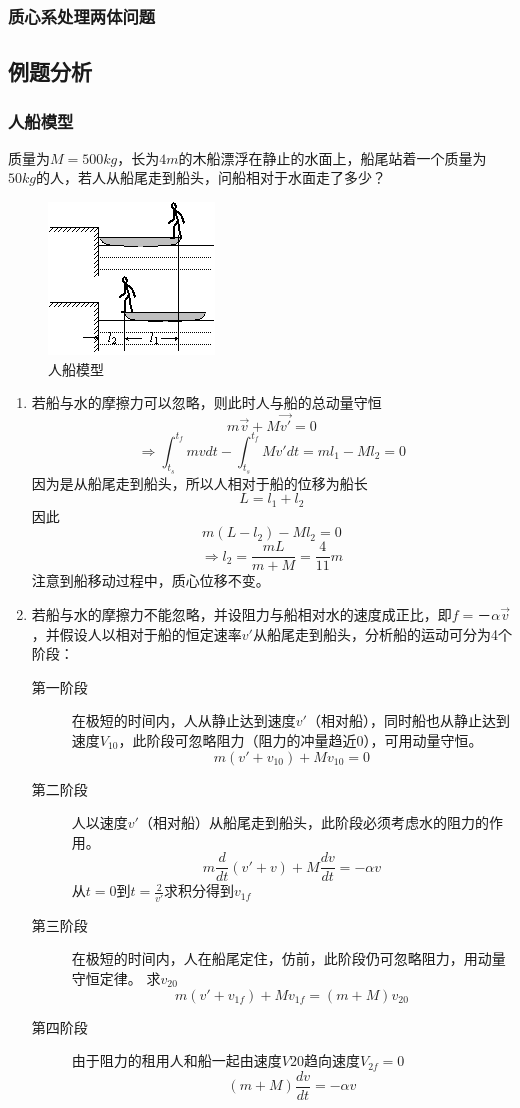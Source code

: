 \subsubsection{质心系处理两体问题}
\subsection{例题分析}
\subsubsection{人船模型}
质量为$M=500kg$，长为$4m$的木船漂浮在静止的水面上，船尾站着一个质量为$50kg$的人，若人从船尾走到船头，问船相对于水面走了多少？
\begin{figure} [ht]
\centering
\includegraphics[scale=.6]{renchuan.png}
\caption{\simsun 人船模型}
\label{renchuan}
\end{figure}

\begin{enumerate}
\item 若船与水的摩擦力可以忽略，则此时人与船的总动量守恒
\[m\vec{v}+M\vec{v'}=0\]
\[\Rightarrow\int_{t_s}^{t_f}mvdt-\int_{t_s}^{t_f}Mv'dt=ml_1-Ml_2=0\]
因为是从船尾走到船头，所以人相对于船的位移为船长
\[L=l_1+l_2\]
因此
\[m(L-l_2)-Ml_2=0\]
\[\Rightarrow l_2=\frac{mL}{m+M}=\frac{4}{11}m\]
注意到船移动过程中，质心位移不变。
\item 若船与水的摩擦力不能忽略，并设阻力与船相对水的速度成正比，即$f=－\alpha\vec{v}$，并假设人以相对于船的恒定速率$v'$从船尾走到船头，分析船的运动可分为4个阶段：\begin{description}
\item[第一阶段]在极短的时间内，人从静止达到速度$v'$（相对船），同时船也从静止达到速度$V_{10}$，此阶段可忽略阻力（阻力的冲量趋近0），可用动量守恒。
\[m(v'+v_{10})+Mv_{10}=0\]
\item[第二阶段]人以速度$v'$（相对船）从船尾走到船头，此阶段必须考虑水的阻力的作用。
\[m\frac{d}{dt}(v'+v)+M\frac{dv}{dt}=-\alpha v\]
从$t=0$到$t=\frac{2}{v'}$求积分得到$v_{1f}$
\item[第三阶段]在极短的时间内，人在船尾定住，仿前，此阶段仍可忽略阻力，用动量守恒定律。
求$v_{20}$
\[m(v'+v_{1f})+Mv_{1f}=(m+M)v_{20}\]
\item[第四阶段]由于阻力的租用人和船一起由速度$V{20}$趋向速度$V_{2f}=0$
\[(m+M)\frac{dv}{dt}=-\alpha v\]
\end{description}
\end{enumerate}
